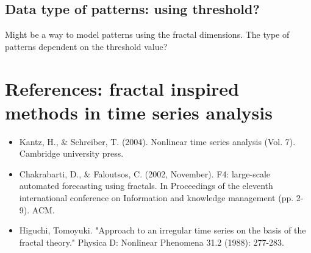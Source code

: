 \documentclass[11pt]{article}
\begin{document}
\subsection*{Data type of patterns: using threshold?}
\label{sec:org8c50b4c}
Might be a way to model patterns using the fractal dimensions. The type of patterns dependent on the threshold value? 

\section*{References: fractal inspired methods in time series analysis}
\label{sec:orgaa5d4d1}
\begin{itemize}
\item Kantz, H., \& Schreiber, T. (2004). Nonlinear time series analysis (Vol. 7). Cambridge university press.
\item Chakrabarti, D., \& Faloutsos, C. (2002, November). F4: large-scale automated forecasting using fractals. In Proceedings of the eleventh international conference on Information and knowledge management (pp. 2-9). ACM.
\item Higuchi, Tomoyuki. "Approach to an irregular time series on the basis of the fractal theory." Physica D: Nonlinear Phenomena 31.2 (1988): 277-283.
\end{itemize}
\end{document}
